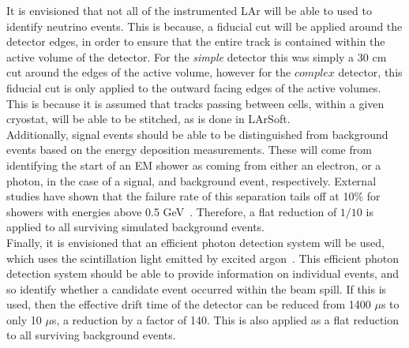 It is envisioned that not all of the instrumented LAr will be able to used to identify neutrino events. This is because, a fiducial cut will be applied around the detector edges, in order to ensure that the entire track is contained within the active volume of the detector. For the \emph{simple} detector this was simply a 30 cm cut around the edges of the active volume, however for the $complex$ detector, this fiducial cut is only applied to the outward facing edges of the active volumes. This is because it is assumed that tracks passing between cells, within a given cryostat, will be able to be stitched, as is done in LArSoft. \\

Additionally, signal events should be able to be distinguished from background events based on the energy deposition measurements. These will come from identifying the start of an EM shower as coming from either an electron, or a photon, in the case of a signal, and background event, respectively. External studies have shown that the failure rate of this separation tails off at 10\% for showers with energies above 0.5 GeV~\citep{LBNE8458}. Therefore, a flat reduction of $1/10$ is applied to all surviving simulated background events. \\

Finally, it is envisioned that an efficient photon detection system will be used, which uses the scintillation light emitted by excited argon~\citep{PhysRevB.27.5279}. This efficient photon detection system should be able to provide information on individual events, and so identify whether a candidate event occurred within the beam spill. If this is used, then the effective drift time of the detector can be reduced from 1400 $\mu$s to only 10 $\mu$s, a reduction by a factor of 140. This is also applied as a flat reduction to all surviving background events. \\


